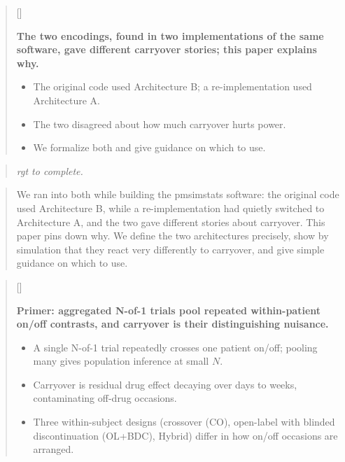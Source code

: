 \documentclass[
  11pt,
]{article}
\newcounter{pgraph}
\newenvironment{bullets}{%
  \stepcounter{pgraph}%
  \begin{quote}\small\sffamily\color[gray]{0.30}%
  {\normalfont\scriptsize\color[gray]{0.58}[\thepgraph]\enspace}}{%
  \end{quote}}
\newenvironment{rgt}{%
  \begin{quote}\small\itshape\color[RGB]{20,60,160}}{%
  \end{quote}}
\newenvironment{orig}{%
  \begin{quote}\normalsize\color[gray]{0.55}}{%
  \end{quote}}
\begin{document}
\begin{bullets}

\textbf{The two encodings, found in two implementations of the same
software, gave different carryover stories; this paper explains
why.}

\begin{itemize}\setlength{\itemsep}{2pt}\setlength{\parskip}{0pt}
\item The original code used Architecture B; a re-implementation
used Architecture A.
\item The two disagreed about how much carryover hurts power.
\item We formalize both and give guidance on which to use.
\end{itemize}

\end{bullets}

\begin{rgt}
rgt to complete.

\end{rgt}

\begin{orig}
We ran into both while building the pmsimstats software: the original
code used Architecture B, while a re-implementation had quietly switched
to Architecture A, and the two gave different stories about carryover.
This paper pins down why. We define the two architectures precisely,
show by simulation that they react very differently to carryover, and
give simple guidance on which to use.

\end{orig}

\begin{bullets}

\textbf{Primer: aggregated N-of-1 trials pool repeated
within-patient on/off contrasts, and carryover is their
distinguishing nuisance.}

\begin{itemize}\setlength{\itemsep}{2pt}\setlength{\parskip}{0pt}
\item A single N-of-1 trial repeatedly crosses one patient on/off;
pooling many gives population inference at small $N$.
\item Carryover is residual drug effect decaying over days to weeks,
contaminating off-drug occasions.
\item Three within-subject designs (crossover (CO), open-label
with blinded discontinuation (OL+BDC), Hybrid) differ in
how on/off occasions are arranged.
\end{itemize}

\end{bullets}
\end{document}
